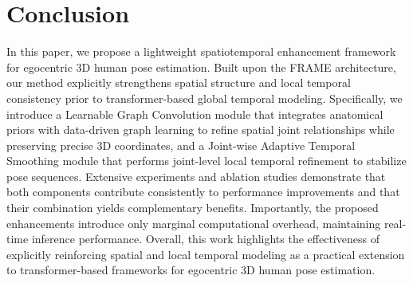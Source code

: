 \documentclass[conference]{IEEEtran}
\begin{document}
\section{Conclusion}
In this paper, we propose a lightweight spatiotemporal enhancement framework for egocentric 3D human pose estimation. Built upon the FRAME architecture, our method explicitly strengthens spatial structure and local temporal consistency prior to transformer-based global temporal modeling. Specifically, we introduce a Learnable Graph Convolution module that integrates anatomical priors with data-driven graph learning to refine spatial joint relationships while preserving precise 3D coordinates, and a Joint-wise Adaptive Temporal Smoothing module that performs joint-level local temporal refinement to stabilize pose sequences. Extensive experiments and ablation studies demonstrate that both components contribute consistently to performance improvements and that their combination yields complementary benefits. Importantly, the proposed enhancements introduce only marginal computational overhead, maintaining real-time inference performance. Overall, this work highlights the effectiveness of explicitly reinforcing spatial and local temporal modeling as a practical extension to transformer-based frameworks for egocentric 3D human pose estimation.
\end{document}
